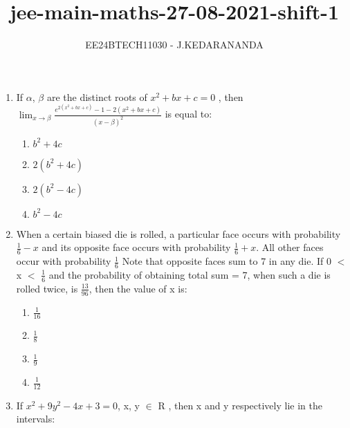 \documentclass[journal]{IEEEtran}
\renewcommand{\thefigure}{\theenumi}
\renewcommand{\thetable}{\theenumi}
\numberwithin{equation}{enumi}
\numberwithin{figure}{enumi}
\renewcommand{\thetable}{\theenumi}
\begin{document}

\vspace{3cm}

\title{jee-main-maths-27-08-2021-shift-1}
\author{EE24BTECH11030 - J.KEDARANANDA}
{\let\newpage\relax\maketitle}
\renewcommand{\thefigure}{\theenumi}
\renewcommand{\thetable}{\theenumi}
\begin{enumerate}
    \item If $\alpha$, $\beta$ are the distinct roots of $x^2+ bx + c = 0$ , then $\lim_{x \to \beta}\frac{e^{2(x^2 + bx + c)} - 1 - 2(x^2 + bx + c)}{{(x - \beta)}^2}$ is equal to:  \\ 
    \begin{multicols}{4}
    \begin{enumerate}
        \item $b^2 + 4c$
        \item $2(b^2 + 4c)$
        \item $2(b^2 - 4c)$
        \item $b^2 - 4c$
    \end{enumerate}
    \end{multicols}
    \item When a certain biased die is rolled, a particular face occurs with probability $\frac{1}{6} - x$ and its opposite face occurs with probability $\frac{1}{6} + x$. All other faces occur with probability $\frac{1}{6}$ Note that opposite faces sum to 7 in any die. If 0 $<$ x $<$ $\frac{1}{6}$ and the probability of obtaining total sum = 7, when such a die is rolled twice, is $\frac{13}{96}$, then the value of x is:  \\
    \begin{multicols}{4}
    \begin{enumerate}
        \item $\frac{1}{16}$
        \item $\frac{1}{8}$
        \item $\frac{1}{9}$
        \item $\frac{1}{12}$
    \end{enumerate} 
    \end{multicols}
    \item If $x^2+ 9y^2 - 4x + 3 = 0$, x, y $\in$ R , then x and y respectively lie in the intervals:  \\

\end{enumerate}
\end{document}
